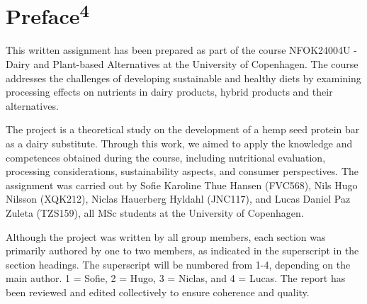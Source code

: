 \setlength{\headheight}{12.71342pt}
\addtolength{\topmargin}{-0.71342pt}


\section*{Preface\textsuperscript{4}}
This written assignment has been prepared as part of the course NFOK24004U - Dairy and Plant-based Alternatives at the University of Copenhagen. The course addresses the challenges of developing sustainable and healthy diets by examining processing effects on nutrients in dairy products, hybrid products and their alternatives. 

\vspace{1em}
The project is a theoretical study on the development of a hemp seed protein bar as a dairy substitute. Through this work, we aimed to apply the knowledge and competences obtained during the course, including nutritional evaluation, processing considerations, sustainability aspects, and consumer perspectives. The assignment was carried out by Sofie Karoline Thue Hansen (FVC568), Nils Hugo Nilsson (XQK212), Niclas Hauerberg Hyldahl (JNC117), and Lucas Daniel Paz Zuleta (TZS159), all MSc students at the University of Copenhagen.

\vspace{1em}
Although the project was written by all group members, each section was primarily authored by one to two members, as indicated in the superscript in the section headings. The superscript will be numbered from 1-4, depending on the main author. 1 = Sofie, 2 = Hugo, 3 = Niclas, and 4 = Lucas. The report has been reviewed and edited collectively to ensure coherence and quality.

